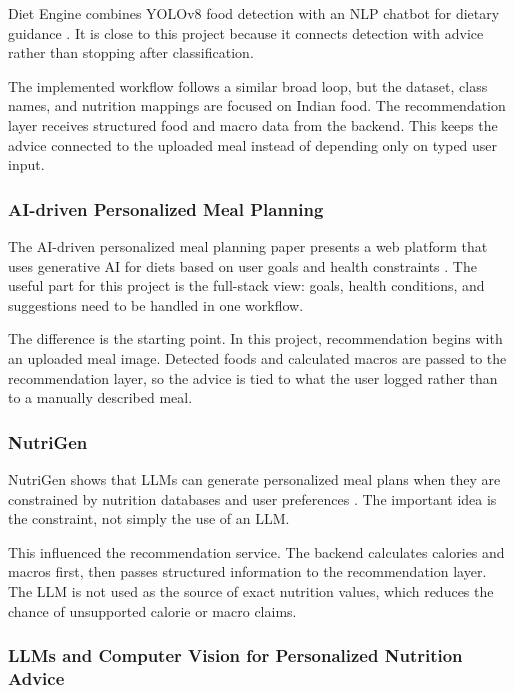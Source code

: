 Diet Engine combines YOLOv8 food detection with an NLP chatbot for dietary guidance \cite{diet_engine_2025}. It is close to this project because it connects detection with advice rather than stopping after classification.

The implemented workflow follows a similar broad loop, but the dataset, class names, and nutrition mappings are focused on Indian food. The recommendation layer receives structured food and macro data from the backend. This keeps the advice connected to the uploaded meal instead of depending only on typed user input.

\subsubsection{AI-driven Personalized Meal Planning}

The AI-driven personalized meal planning paper presents a web platform that uses generative AI for diets based on user goals and health constraints \cite{genai_meal_planning_2025}. The useful part for this project is the full-stack view: goals, health conditions, and suggestions need to be handled in one workflow.

The difference is the starting point. In this project, recommendation begins with an uploaded meal image. Detected foods and calculated macros are passed to the recommendation layer, so the advice is tied to what the user logged rather than to a manually described meal.

\subsubsection{NutriGen}

NutriGen shows that LLMs can generate personalized meal plans when they are constrained by nutrition databases and user preferences \cite{nutrigen_2025}. The important idea is the constraint, not simply the use of an LLM.

This influenced the recommendation service. The backend calculates calories and macros first, then passes structured information to the recommendation layer. The LLM is not used as the source of exact nutrition values, which reduces the chance of unsupported calorie or macro claims.

\subsubsection{LLMs and Computer Vision for Personalized Nutrition Advice}

